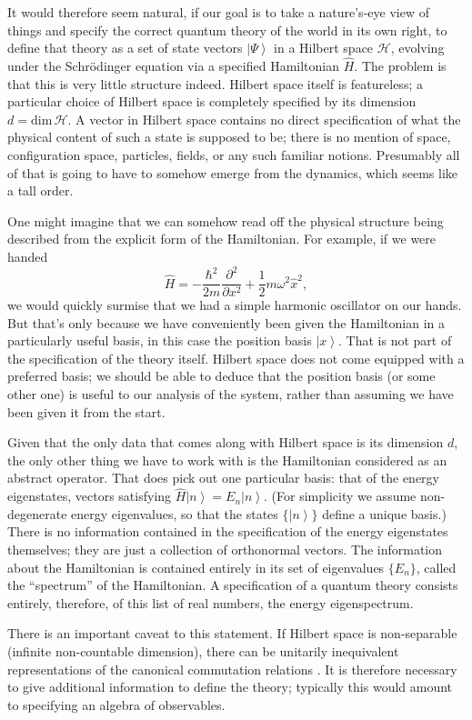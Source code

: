\documentclass[12pt,english]{article}
\newcommand{\be}{\begin{equation}}
\newcommand{\ee}{\end{equation}}
\newcommand{\ham}{\hat{H}}
\newcommand{\HH}{\mathcal{H}}
\newcommand{\ket}[1]{\left| #1 \right\rangle}
\begin{document}
It would therefore seem natural, if our goal is to take a nature's-eye view of things and specify the correct quantum theory of the world in its own right, to define that theory as a set of state vectors $\ket{\Psi}$ in a Hilbert space $\HH$, evolving under the Schr\"odinger equation via a specified Hamiltonian $\ham$.
The problem is that this is very little structure indeed.
Hilbert space itself is featureless; a particular choice of Hilbert space is completely specified by its dimension $d = \mathrm{dim}\,\HH$.
A vector in Hilbert space contains no direct specification of what the physical content of such a state is supposed to be; there is no mention of space, configuration space, particles, fields, or any such familiar notions.
Presumably all of that is going to have to somehow emerge from the dynamics, which seems like a tall order.

One might imagine that we can somehow read off the physical structure being described from the explicit form of the Hamiltonian.
For example, if we were handed
\be
  \ham = -\frac{\hbar^{2}}{2 m} \frac{\partial^{2}}{\partial x^{2}}+\frac{1}{2} m \omega^{2} \hat{x}^{2},
\ee
we would quickly surmise that we had a simple harmonic oscillator on our hands.
But that's only because we have conveniently been given the Hamiltonian in a particularly useful basis, in this case the position basis $\ket{x}$.
That is not part of the specification of the theory itself. 
Hilbert space does not come equipped with a preferred basis; we should be able to deduce that the position basis (or some other one) is useful to our analysis of the system, rather than assuming we have been given it from the start.

Given that the only data that comes along with Hilbert space is its dimension $d$, the only other thing we have to work with is the Hamiltonian considered as an abstract operator.
That does pick out one particular basis: that of the energy eigenstates, vectors satisfying $\ham \ket{n} = E_n\ket{n}$.
(For simplicity we assume non-degenerate energy eigenvalues, so that the states $\{\ket{n}\}$ define a unique basis.)
There is no information contained in the specification of the energy eigenstates themselves; they are just a collection of orthonormal vectors.
The information about the Hamiltonian is contained entirely in its set of eigenvalues $\{E_n\}$, called the ``spectrum'' of the Hamiltonian.
A specification of a quantum theory consists entirely, therefore, of this list of real numbers, the energy eigenspectrum.

There is an important caveat to this statement.
If Hilbert space is non-separable (infinite non-countable dimension), there can be unitarily inequivalent representations of the canonical commutation relations \citep{haag55}.
It is therefore necessary to give additional information to define the theory; typically this would amount to specifying an algebra of observables.
\end{document}
